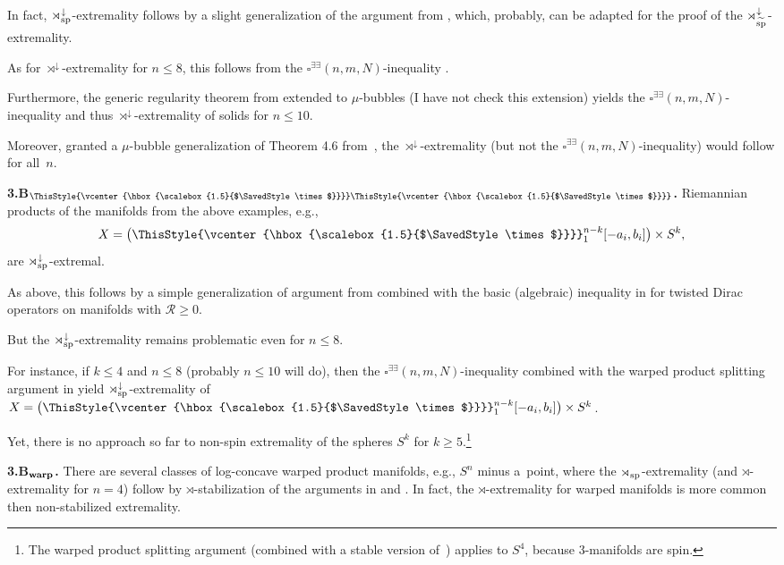 \documentclass[pdftex]{sigma}
\numberwithin{equation}{section}
\newcommand\bigtimes{\mathbin{\ThisStyle{\vcenter{\hbox{%
\scalebox{1.5}{$\SavedStyle\times$}}}}}}
\begin{document}
 In fact, $\rtimes^{\downarrow}_{\rm sp}$-extremality follows by a slight generalization of the argument from \cite{WXY2021}, which,
probably, can be adapted for the proof of the
 $\rtimes^{\downarrow}_{\widetilde{\rm sp}}$-extremality.

 As for $\rtimes^{\downarrow}$-extremality for $n\leq 8$, this follows from
 the $\square^{\exists\exists}(n,m,N)$-inequality  \cite[\S2.B]{Gr2023}.

 Furthermore, the generic regularity theorem from \cite{CMS2023} extended to $\mu$-bubbles (I have not check this extension) yields the $\square^{\exists\exists}(n,m,N)$-inequality and thus $\rtimes^{\downarrow}$-extremality of solids for $n\leq10$.

 Moreover, granted
 a $\mu$-bubble generalization of Theorem 4.6 from~\cite{SY2017}, the $\rtimes^{\downarrow}$-extremality (but not the $\square^{\exists\exists}(n,m,N)$-inequality) would follow for all~$n$.

 \textbf{3.B$\boldsymbol{{}_{\bigtimes \bigtimes}}$.}
 Riemannian products of the manifolds from the above examples,
 e.g.,
 \[
 X= \bigl(\bigtimes_1^{n-k}[-a_i,b_i]\bigr)\times S^k,
 \]
  are $\rtimes^{\downarrow}_{\rm sp}$-extremal.

As above, this follows by a simple generalization of argument from \cite{WXY2021}
 combined with the basic (algebraic) inequality in \cite{GS2002} for twisted Dirac operators on manifolds
 with $\mathcal R\geq 0$.

But the $\rtimes^{\downarrow}_{\rm sp}$-extremality remains problematic even for $n\leq 8$.

 For instance, if $k\leq 4$ and $n\leq 8$ (probably $n\leq 10$ will do), then the $\square^{\exists\exists}(n,m,N)$-inequality combined with the warped product splitting argument in \cite[\S5.5]{Gr2021} yield
 $\rtimes^{\downarrow}_{\rm sp}$-extremality of $X= \bigl(\bigtimes_1^{n-k}[-a_i,b_i]\bigr)\times S^k$.

 Yet, there is no approach so far to non-spin extremality of the spheres $S^k$ for $k\geq 5$.\footnote{The warped product splitting argument (combined with a stable version of~\cite{GS2002}) applies to $S^4$, because 3-manifolds are spin.}

 \textbf{3.B$\boldsymbol{{}_{\rm warp}}$.} There are several classes of log-concave
 warped product manifolds,
 e.g., $S^n$ minus a~point, where the $\rtimes_{\rm sp}$-extremality (and $\rtimes$-extremality for $n=4$) follow by
 $\rtimes$-stabilization of the arguments in \cite[\S\S5.5--5.7]{Gr2021} and \cite{CZ2021a}.
  In fact, the $\rtimes$-extremality for warped manifolds is more common then non-stabilized extremality.
\end{document}
